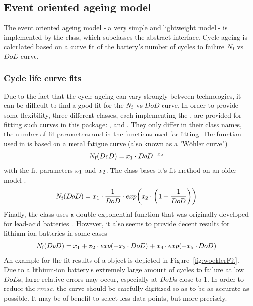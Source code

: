 \subsection{Event oriented ageing model}
\label{sec:eoAgeModel}
The event oriented ageing model - a very simple and lightweight model - is implemented by the  class, which subclasses the abstract  interface. Cycle ageing is calculated based on a curve fit of the battery's number of cycles to failure $N_\text{f}$ vs $DoD$ curve.

\subsubsection{Cycle life curve fits}
Due to the fact that the cycle ageing can vary strongly between technologies, it can be difficult to find a good fit for the $N_\text{f}$ vs $DoD$ curve. In order to provide some flexibility, three different classes, each implementing the , are provided for fitting such curves in this package: ,  and .
They only differ in their class names, the number of fit parameters and in the functions used for fitting. The function used in  is based on a metal fatigue curve (also known as a "W{\"o}hler curve")~\cite{naumann_betriebsabhangige_2014}
\begin{equation}
N_\text{f}(DoD) = x_\text{1}\cdot DoD^{-x_\text{2}}
\end{equation}
with the fit parameters $x_\text{1}$ and $x_\text{2}$. The  class bases it's fit method on an older model \cite{drouilhet_battery_1997}.
\begin{equation}
N_\text{f}(DoD) = x_\text{1}\cdot \frac{1}{DoD}\cdot exp\bigg(x_\text{2}\cdot \bigg(1 - \frac{1}{DoD}\bigg)\bigg)
\end{equation}
Finally, the  class uses a double exponential function that was originally developed for lead-acid batteries~\cite{bindner_lifetime_2005}. However, it also seems to provide decent results for lithium-ion batteries in some cases.
\begin{equation}
N_\text{f}(DoD) = x_\text{1} + x_\text{2}\cdot exp(-x_\text{3}\cdot DoD) + x_\text{4}\cdot exp(-x_\text{5}\cdot DoD)
\end{equation}
An example for the fit results of a  object is depicted in Figure~\ref{fig:woehlerFit}. Due to a lithium-ion battery's extremely large amount of cycles to failure at low $DoD$s, large relative errors may occur, especially at $DoD$s close to 1. In order to reduce the $rmse$, the curve should be carefully digitized so as to be as accurate as possible. It may be of benefit to select less data points, but more precisely. 
